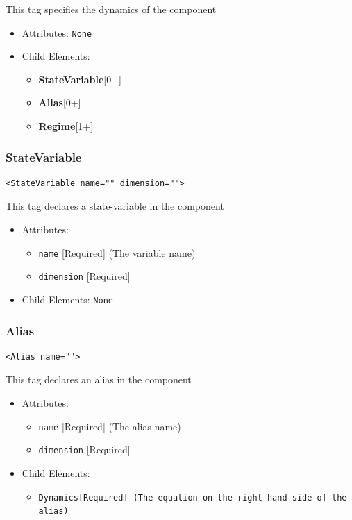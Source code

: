 \documentclass{article}
\newcommand{\MathInline}{\tt{Dynamics}}
\newcommand{\StateVariable}{{\bf{StateVariable}}\xspace}
\newcommand{\Alias}{{\bf{Alias}}\xspace}
\newcommand{\Regime}{{\bf{Regime}}\xspace}
\begin{document}
This tag specifies the dynamics of the component

\begin{itemize}
\item Attributes: \texttt{None}

\item Child Elements:
%
\begin{itemize}
\item \StateVariable {[}0+{]}
\item \Alias {[}0+{]}
\item \Regime {[}1+{]}
\end{itemize}

\end{itemize}

\subsubsection{StateVariable}
%
\begin{lstlisting}
<StateVariable name="" dimension="">
\end{lstlisting}

This tag declares a state-variable in the component

\begin{itemize}
\item Attributes:
%
\begin{itemize}
\item \verb|name| {[}Required{]} (The variable name)
\item \verb|dimension| {[}Required{]}
\end{itemize}

\item Child Elements: \texttt{None}
\end{itemize}

\subsubsection{Alias}
%
\begin{lstlisting}
<Alias name="">
\end{lstlisting}

This tag declares an alias in the component

\begin{itemize}
\item Attributes:
\begin{itemize}
\item \verb|name| {[}Required{]} (The alias name)
\item \verb|dimension| {[}Required{]}
\end{itemize}

\item Child Elements:
\begin{itemize}
\item \MathInline {[}Required{]} (The equation on the right-hand-side of the
alias)
\end{itemize}
\end{itemize}
\end{document}
